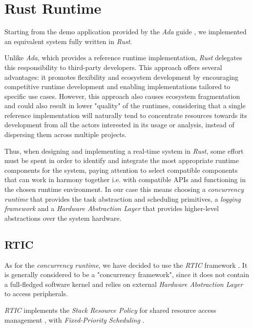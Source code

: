 \section{Rust Runtime}

Starting from the demo application provided by the \textit{Ada} guide
\cite{burnsGuideUseAda2004}, we implemented an equivalent system
fully written in \textit{Rust}. 

Unlike \textit{Ada}, which provides a reference runtime implementation,
\textit{Rust} delegates this responsibility to third-party developers. This
approach offers several advantages: it promotes flexibility and ecosystem
development by encouraging competitive runtime development and enabling
implementations tailored to specific use cases. However, this approach also
causes ecosystem fragmentation and could also result in lower "quality" of the
runtimes, considering that a single reference implementation will naturally tend
to concentrate resources towards its development from all the actors interested
in its usage or analysis, instead of dispersing them across multiple projects. 

Thus, when designing and implementing a real-time system in \textit{Rust}, some
effort must be spent in order to identify and integrate the most appropriate
runtime components for the system, paying attention to select compatible
components that can work in harmony together \label{lab:harmony-definition}
i.e. with compatible APIs and functioning in the chosen runtime
environment. In our case this means choosing a \textit{concurrency runtime}
that provides the task abstraction and scheduling primitives, a \textit{logging
framework} and a \textit{Hardware Abstraction Layer} that provides higher-level
abstractions over the system hardware.  

\subsection{RTIC} \label{subsec:rtic}

As for the \textit{concurrency runtime}, we have decided to use the
\textit{RTIC} framework \cite{RticrsRtic2025}. It is generally considered to be
a "concurrency framework", since it does not contain a full-fledged software
kernel and relies on external \textit{Hardware Abstraction Layer} to access
peripherals. 

\textit{RTIC} implements the \textit{Stack Resource Policy} for shared resource
access management \cite{bakerStackbasedSchedulingRealtime1991}, with
\textit{Fixed-Priority Scheduling} \cite[Chapter~6]{liuRealTimeSystems2000}. 

